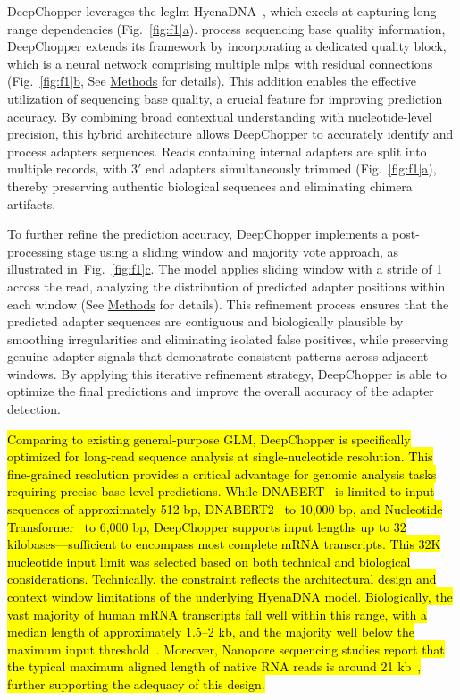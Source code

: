 \documentclass[pdflatex,sn-nature, lineno]{sn-jnl}%
\newcommand{\figref}[2]{Fig.~\hyperref[#1]{\ref*{#1}#2}}
\begin{document}
DeepChopper leverages the \gls{lcglm} HyenaDNA~\cite{nguyen2024hyenadna}, which excels at capturing long-range dependencies (\figref{fig:f1}{a}).
process sequencing base quality information, DeepChopper extends its framework by incorporating a dedicated quality block, which is a neural network comprising multiple \glspl{mlp} with residual connections~\cite{he2015deep} (\figref{fig:f1}{b}, See \hyperref[sec:methods]{Methods} for details).
This addition enables the effective utilization of sequencing base quality, a crucial feature for improving prediction accuracy.
By combining broad contextual understanding with nucleotide-level precision, this hybrid architecture allows DeepChopper to accurately identify and process adapters sequences.
Reads containing internal adapters are split into multiple records, with $3'$ end adapters simultaneously trimmed (\figref{fig:f1}{a}), thereby preserving authentic biological sequences and eliminating chimera artifacts.

To further refine the prediction accuracy, DeepChopper implements a post-processing stage using a sliding window and majority vote approach, as illustrated in~\figref{fig:f1}{c}.
The model applies sliding window with a stride of 1 across the read, analyzing the distribution of predicted adapter positions within each window (See \hyperref[sec:methods]{Methods} for details).
This refinement process ensures that the predicted adapter sequences are contiguous and biologically plausible by smoothing irregularities and eliminating isolated false positives, while preserving genuine adapter signals that demonstrate consistent patterns across adjacent windows.
By applying this iterative refinement strategy, DeepChopper is able to optimize the final predictions and improve the overall accuracy of the adapter detection.

\hl{Comparing to existing general-purpose GLM, DeepChopper is specifically optimized for long-read sequence analysis at single-nucleotide resolution.
	This fine-grained resolution provides a critical advantage for genomic analysis tasks requiring precise base-level predictions.
	While DNABERT\mbox{~\cite{ji2021dnabert}} is limited to input sequences of approximately 512 bp, DNABERT2\mbox{~\cite{zhou2023dnabert2}} to 10,000 bp, and Nucleotide Transformer\mbox{~\cite{dalla2024nucleotide}} to 6,000 bp, DeepChopper supports input lengths up to 32 kilobases—sufficient to encompass most complete mRNA transcripts.
	This 32K nucleotide input limit was selected based on both technical and biological considerations. Technically, the constraint reflects the architectural design and context window limitations of the underlying HyenaDNA model.
	Biologically, the vast majority of human mRNA transcripts fall well within this range, with a median length of approximately 1.5–2 kb, and the majority well below the maximum input threshold\mbox{~\cite{lopes2021gene}}.
	Moreover, Nanopore sequencing studies report that the typical maximum aligned length of native RNA reads is around 21 kb\mbox{~\cite{workman2019nanopore}}, further supporting the adequacy of this design.}
\end{document}
